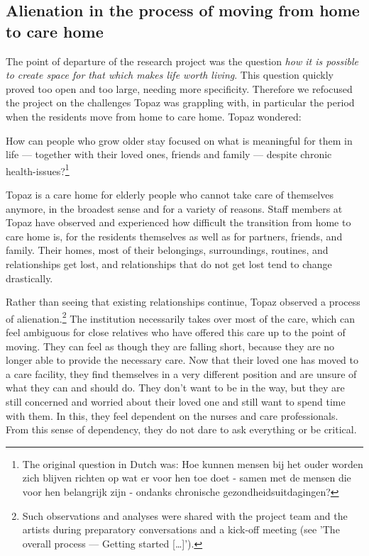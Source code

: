 \documentclass[authordate, empirical]{jote-new-article}
\begin{document}
	\subsection{Alienation in the process of moving from home to care home}



	The point of departure of the research project was the question \emph{how it is possible to create space for that which makes life worth living}. This question quickly proved too open and too large, needing more specificity. Therefore we refocused the project on the challenges Topaz was grappling with, in particular the period when the residents move from home to care home. Topaz wondered:







	How can people who grow older stay focused on what is meaningful for them in life — together with their loved ones, friends and family — despite chronic health-issues?\footnote{ The original question in Dutch was: Hoe kunnen mensen bij het ouder worden zich blijven richten op wat er voor hen toe doet - samen met de mensen die voor hen belangrijk zijn - ondanks chronische gezondheidsuitdagingen?}







	Topaz is a care home for elderly people who cannot take care of themselves anymore, in the broadest sense and for a variety of reasons. Staff members at Topaz have observed and experienced how difficult the transition from home to care home is, for the residents themselves as well as for partners, friends, and family. Their homes, most of their belongings, surroundings, routines, and relationships get lost, and relationships that do not get lost tend to change drastically.







	Rather than seeing that existing relationships continue, Topaz observed a process of alienation.\footnote{ Such observations and analyses were shared with the project team and the artists during preparatory conversations and a kick-off meeting (see 'The overall process --- Getting started […]').} The institution necessarily takes over most of the care, which can feel ambiguous for close relatives who have offered this care up to the point of moving. They can feel as though they are falling short, because they are no longer able to provide the necessary care. Now that their loved one has moved to a care facility, they find themselves in a very different position and are unsure of what they can and should do. They don't want to be in the way, but they are still concerned and worried about their loved one and still want to spend time with them. In this, they feel dependent on the nurses and care professionals. From this sense of dependency, they do not dare to ask everything or be critical.
\end{document}
